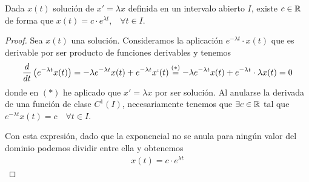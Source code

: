 \begin{prop}
    Dada $x(t)$ solución de $x'=\lambda x$ definida en un intervalo abierto $I$, existe $c\in \mathbb{R}$ de forma que $x(t)=c \cdot e^{\lambda t}$,\ \ $\forall t \in I$.

    \begin{proof}
        Sea $x(t)$ una solución. Consideramos la aplicación $e^{-\lambda t} \cdot x(t)$ que es derivable por ser producto de funciones derivables y tenemos
        \begin{gather*}
            \frac{d}{dt}\left( e^{-\lambda t} x(t)\right) = -\lambda e^{-\lambda t} x(t) + e^{-\lambda t}x`(t) \overset{(*)}{=}-\lambda e^{-\lambda t} x(t) + e^{-\lambda t}\cdot \lambda x(t) = 0
        \end{gather*}
        donde en $(*)$ he aplicado que $x'=\lambda x$ por ser solución. Al anularse la derivada de una función de clase $C^1(I)$, necesariamente tenemos que $\exists c \in \mathbb{R}$ tal que $e^{-\lambda t}x(t)=c$\ \ $\forall t \in I$.

        Con esta expresión, dado que la exponencial no se anula para ningún valor del dominio podemos dividir entre ella y obtenemos
        \begin{gather*}
            x(t)=c\cdot e^{\lambda t}
        \end{gather*}
    \end{proof}
\end{prop}